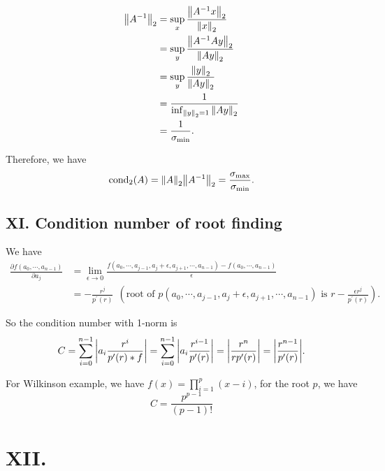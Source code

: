 \documentclass[a4paper]{article}
\begin{document}
\begin{equation}
    \begin{aligned}
        \norm{A^{-1}}_2 &= \sup_{x} \frac{\norm{A^{-1}x}_2}{\norm{x}_2} \\
        &= \sup_{y} \frac{\norm{A^{-1}A y}_2}{\norm{Ay}_2} \\
        &= \sup_{y} \frac{\norm{y}_2}{\norm{Ay}_2} \\
        &= \frac{1}{\inf_{\norm{y}_2=1} \norm{Ay}_2} \\
        &= \frac{1}{\sigma_{\min}}.
    \end{aligned}
\end{equation}

Therefore, we have
\begin{equation}
    \text{cond}_2(A) = \norm{A}_2 \norm{A^{-1}}_2 = \frac{\sigma_{\max}}{\sigma_{\min}}.
\end{equation}

\subsection*{XI. Condition number of root finding}

We have
\begin{equation}
    \begin{aligned}
        \frac{\partial f(a_0, \cdots, a_{n-1})}{\partial a_j} &= \lim_{\epsilon \to 0} \frac{f(a_0, \cdots, a_{j-1}, a_j+\epsilon, a_{j+1}, \cdots, a_{n-1}) - f(a_0, \cdots, a_{n-1})}{\epsilon} \\
        &= -\frac{r^j}{p^\prime(r)}~~(\text{root of }p(a_0, \cdots, a_{j-1}, a_j+\epsilon, a_{j+1}, \cdots, a_{n-1}) \text{ is } r-\frac{\epsilon r^j}{p^\prime(r)}).
    \end{aligned}
\end{equation}

So the condition number with 1-norm is 
\begin{equation}
    C = \sum_{i=0}^{n-1} \abs{a_i \frac{r^i}{p^\prime(r) * f}} = \sum_{i=0}^{n-1} \abs{a_i \frac{r^{i-1}}{p^\prime(r)}} = \abs{\frac{r^n}{r p^\prime(r)}} = \abs{\frac{r^{n-1}}{p^\prime(r)}}.
\end{equation}


For Wilkinson example, we have $f(x) = \prod_{i=1}^{p}(x-i)$, for the root $p$, we have 
\begin{equation}
    C = \frac{p^{p-1}}{(p-1)!}
\end{equation}


\section*{XII. }
\end{document}
